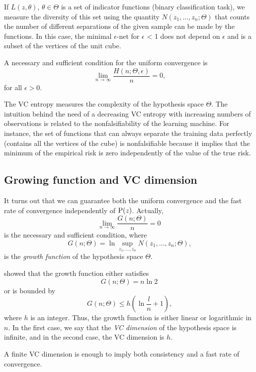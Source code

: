 If $L(z, \theta)$, $\theta \in \Theta$ is a set of indicator functions (binary
classification task),  we measure the diversity of this set using the quantity $N(z_1,
\dots, z_n; \Theta)$ that counts the number of different separations of the given sample
can be made by the functions.  In this case, the minimal $\epsilon$-net for $\epsilon$ < 1
does not depend on $\epsilon$ and is a subset of the vertices of the unit cube.

A necessary and sufficient condition for the uniform convergence is
\begin{equation}
  \label{eq:uniform-convergence}
  \lim_{n \to \infty} \frac{H(n; \Theta, \epsilon)}{n} = 0\text{,}
\end{equation}
for all $\epsilon > 0$.

The VC entropy measures the complexity of the hypothesis space $\Theta$.  The intuition
behind the need of a decreasing VC entropy with increasing numbers of observations is
related to the nonfalsifiability of the learning machine.  For instance, the set of
functions that can always separate the training data perfectly (contains all the vertices
of the cube) is nonfalsifiable because
it implies that the minimum of the empirical risk is zero independently of the value of
the true risk.

\subsection{Growing function and VC dimension}
\label{sub:vc-dimension}

It turns out that we can guarantee both the uniform convergence and the fast rate of
convergence independently of $\operatorname{P}(z)$.  Actually,
\[
  \lim_{n \to \infty} \frac{G(n; \Theta)}{n} = 0
\]
is the necessary and sufficient condition, where
\[
  G(n; \Theta) = \ln \sup_{z_1, \dots, z_n} N(z_1, \dots, z_n; \Theta)\text{,}
\]
is the \emph{growth function} of the hypothesis space $\Theta$.

\citeauthor{Vapnik1968} showed that the growth function either
satisfies
\[
  G(n; \Theta) = n \ln 2
\]
or is bounded by
\[
  G(n; \Theta) \leq h \left( \ln \frac{l}{n} + 1 \right)\text{,}
\]
where $h$ is an integer.  Thus, the growth function is either linear or logarithmic in
$n$.  In the first case, we say that the \emph{VC dimension} of the hypothesis space is
infinite, and in the second case, the VC dimension is $h$.

A finite VC dimension is enough to imply both consistency and a fast rate of convergence.


